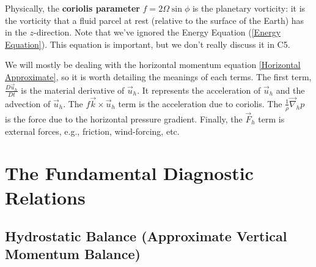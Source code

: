 Physically, the \textbf{coriolis parameter} $f=2\Omega \sin \phi$ is the planetary vorticity: it is the vorticity that a fluid parcel at rest (relative to the surface of the Earth) has in the $z$-direction. Note that we've ignored the Energy Equation (\ref{Energy Equation}). This equation is important, but we don't really discuss it in C5.

We will mostly be dealing with the horizontal momentum equation \ref{Horizontal Approximate}, so it is worth detailing the meanings of each terms. The first term, $\frac{D\vec{u}_h}{Dt}$ is the material derivative of $\vec{u}_h$. It represents the acceleration of $\vec{u}_h$ and the advection of $\vec{u}_h$. The $f\vec{k}\times\vec{u}_h$ term is the acceleration due to coriolis. The $\frac{1}{\rho}\vec{\nabla}_h p$ is the force due to the horizontal pressure gradient. Finally, the $\vec{F}_h$ term is external forces, e.g., friction, wind-forcing, etc.

\chapter{The Fundamental Diagnostic Relations}\label{Dia Relations}

\section{Hydrostatic Balance (Approximate Vertical Momentum Balance)}\label{App Vert Bal}

